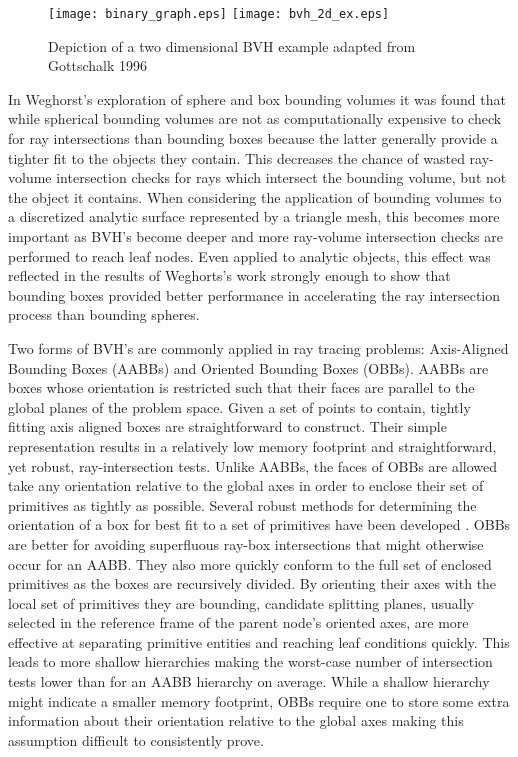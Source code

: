 \begin{figure}[H]
  \centering
  \texttt{[image: binary\_graph.eps]}
  \texttt{[image: bvh\_2d\_ex.eps]}
  \caption{Depiction of a two dimensional BVH example adapted from Gottschalk 1996 \cite{Gottschalk_1996}}
  \label{fig:2D_bvh}
\end{figure}

In Weghorst's exploration of sphere and box bounding volumes it was found that
while spherical bounding volumes are not as computationally expensive to check
for ray intersections than bounding boxes because the latter generally provide a
tighter fit to the objects they contain. This decreases the chance of wasted
ray-volume intersection checks for rays which intersect the bounding volume, but
not the object it contains. When considering the application of bounding volumes
to a discretized analytic surface represented by a triangle mesh, this becomes
 more important as BVH's become deeper and more ray-volume intersection checks are performed to
reach leaf nodes. Even applied to analytic objects, this effect was reflected
in the results of Weghorts's work strongly enough to show that bounding boxes
provided better performance in accelerating the ray intersection process than
bounding spheres.

Two forms of BVH's are commonly applied in ray tracing problems: Axis-Aligned
Bounding Boxes (AABBs) and Oriented Bounding Boxes (OBBs). AABBs are boxes whose
orientation is restricted such that their faces are parallel to the global
planes of the problem space. Given a set of points to contain, tightly fitting
axis aligned boxes are straightforward to construct. Their simple representation
results in a relatively low memory footprint and straightforward, yet robust,
ray-intersection tests. Unlike AABBs, the faces of OBBs are allowed take any
orientation relative to the global axes in order to enclose their set of
primitives as tightly as possible. Several robust methods for determining the
orientation of a box for best fit to a set of primitives have been developed
\cite{Gottschalk_1996,ORourke_1985}. OBBs are better for avoiding superfluous
ray-box intersections that might otherwise occur for an AABB. They also more
quickly conform to the full set of enclosed primitives as the boxes are
recursively divided. By orienting their axes with the local set of primitives
they are bounding, candidate splitting planes, usually selected in the reference
frame of the parent node's oriented axes, are more effective at separating
primitive entities and reaching leaf conditions quickly. This leads to more
shallow hierarchies making the worst-case number of intersection tests lower
than for an AABB hierarchy on average. While a shallow hierarchy might indicate
a smaller memory footprint, OBBs require one to store some extra information
about their orientation relative to the global axes making this assumption
difficult to consistently prove.

